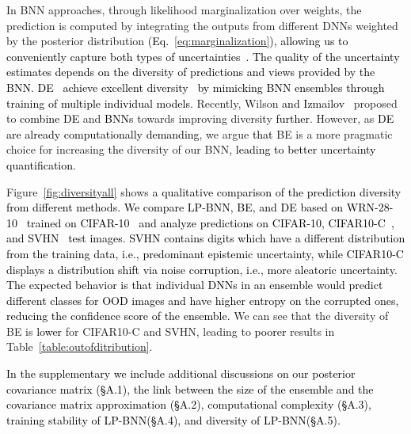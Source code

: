 \documentclass[10pt,twocolumn,letterpaper]{article}
\newcommand{\ab}[1]{\textcolor{black}{#1}}
\newcommand{\method}{LP-BNN\xspace}
\begin{document}
In BNN approaches, through likelihood marginalization over weights, the prediction is computed by integrating the outputs from different DNNs weighted by the posterior distribution \ab{(Eq.~\ref{eq:marginalization}), allowing us to conveniently capture both types of uncertainties~\cite{malinin2018predictive}.} 
\ab{The quality of the uncertainty estimates depends on the diversity of predictions and views provided by the BNN.}
\ab{DE~\cite{lakshminarayanan2017simple} achieve excellent diversity~\cite{fort2019deep} by mimicking BNN ensembles through training of multiple individual models.} 
Recently, Wilson \ab{and Izmailov}~\cite{wilson2020bayesian} proposed to 
\ab{combine DE}
and \ab{BNNs} towards improving diversity \ab{further}. However, as 
\ab{DE are already computationally demanding}, we argue \ab{that} BE is a more 
pragmatic choice for increasing \ab{the} diversity of our BNN\ab{, leading to better uncertainty quantification}.

Figure~\ref{fig:diversityall} shows 
\ab{a qualitative comparison of the prediction diversity from different methods.}
\ab{We compare \method, BE, and DE based on WRN-28-10~\cite{zagoruyko2016wide} trained on CIFAR-10~\cite{krizhevsky2009learning} and analyze predictions on CIFAR-10, CIFAR10-C~\cite{hendrycks2018benchmarking}, and SVHN~\cite{Netzer2011} test images. SVHN contains digits which have a different distribution from the training data, i.e., predominant epistemic uncertainty, while CIFAR10-C displays a distribution shift via noise corruption, i.e., more aleatoric uncertainty.
The expected behavior is that individual DNNs in an ensemble would predict different classes for OOD images and have higher entropy on the corrupted ones, reducing the confidence score of the ensemble.}
We can see that the diversity of BE is 
\ab{lower} for CIFAR10-C and SVHN, leading to \ab{poorer} results in Table~\ref{table:outofditribution}. 

\ab{In the supplementary we include additional discussions on our posterior covariance matrix ({\S}A.1), the link between the size of the ensemble and the covariance matrix approximation ({\S}A.2), computational complexity ({\S}A.3), training stability of \method ({\S}A.4), and diversity of \method ({\S}A.5).}
\end{document}
